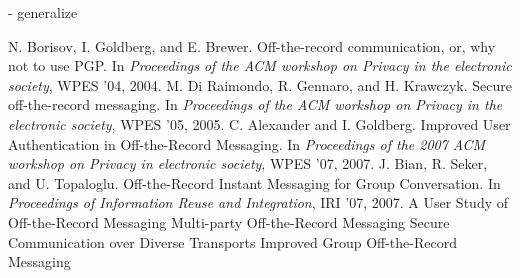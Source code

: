 - generalize

\begin{thebibliography}{xx}
	 N. Borisov, I. Goldberg, and E. Brewer. Off-the-record communication, or, why not to use PGP. In \textit{Proceedings of the ACM workshop on Privacy in the electronic society}, WPES ’04, 2004.
	 M. Di Raimondo, R. Gennaro, and H. Krawczyk. Secure off-the-record messaging. In \textit{Proceedings of the ACM workshop on Privacy in the electronic society}, WPES ’05, 2005.
	 C. Alexander and I. Goldberg. Improved User Authentication in Off-the-Record Messaging. In \textit{Proceedings of the 2007 ACM workshop on Privacy in electronic society}, WPES ’07, 2007.
	 J. Bian, R. Seker, and U. Topaloglu. Off-the-Record Instant Messaging for Group Conversation. In \textit{Proceedings of Information Reuse and Integration}, IRI ’07, 2007.
	 A User Study of Off-the-Record Messaging
	 Multi-party Off-the-Record Messaging
	 Secure Communication over Diverse Transports
	 Improved Group Off-the-Record Messaging
\end{thebibliography}


